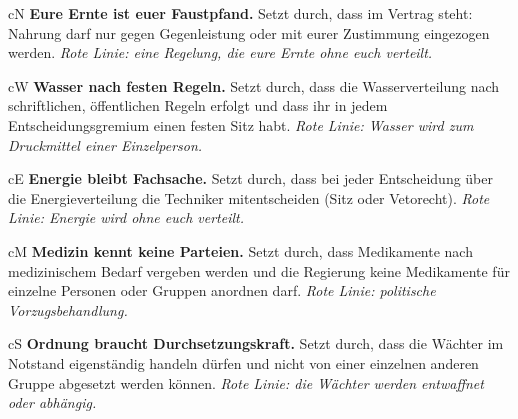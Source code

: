 \begin{schneidbox}[title={Geheimkarte -- nur für Gruppe 1: Hydroponiker},fonttitle=\bfseries]{cN}
\textbf{Eure Ernte ist euer Faustpfand.} Setzt durch, dass im Vertrag steht: Nahrung darf nur gegen Gegenleistung oder mit eurer Zustimmung eingezogen werden. \emph{Rote Linie: eine Regelung, die eure Ernte ohne euch verteilt.}
\end{schneidbox}\par\smallskip
\begin{schneidbox}[title={Geheimkarte -- nur für Gruppe 2: Wasserwerker},fonttitle=\bfseries]{cW}
\textbf{Wasser nach festen Regeln.} Setzt durch, dass die Wasserverteilung nach schriftlichen, öffentlichen Regeln erfolgt und dass ihr in jedem Entscheidungsgremium einen festen Sitz habt. \emph{Rote Linie: Wasser wird zum Druckmittel einer Einzelperson.}
\end{schneidbox}\par\smallskip
\begin{schneidbox}[title={Geheimkarte -- nur für Gruppe 3: Techniker},fonttitle=\bfseries]{cE}
\textbf{Energie bleibt Fachsache.} Setzt durch, dass bei jeder Entscheidung über die Energieverteilung die Techniker mitentscheiden (Sitz oder Vetorecht). \emph{Rote Linie: Energie wird ohne euch verteilt.}
\end{schneidbox}\par\smallskip
\begin{schneidbox}[title={Geheimkarte -- nur für Gruppe 4: Sanitäter},fonttitle=\bfseries]{cM}
\textbf{Medizin kennt keine Parteien.} Setzt durch, dass Medikamente nach medizinischem Bedarf vergeben werden und die Regierung keine Medikamente für einzelne Personen oder Gruppen anordnen darf. \emph{Rote Linie: politische Vorzugsbehandlung.}
\end{schneidbox}\par\smallskip
\begin{schneidbox}[title={Geheimkarte -- nur für Gruppe 5: Wächter},fonttitle=\bfseries]{cS}
\textbf{Ordnung braucht Durchsetzungskraft.} Setzt durch, dass die Wächter im Notstand eigenständig handeln dürfen und nicht von einer einzelnen anderen Gruppe abgesetzt werden können. \emph{Rote Linie: die Wächter werden entwaffnet oder abhängig.}
\end{schneidbox}

